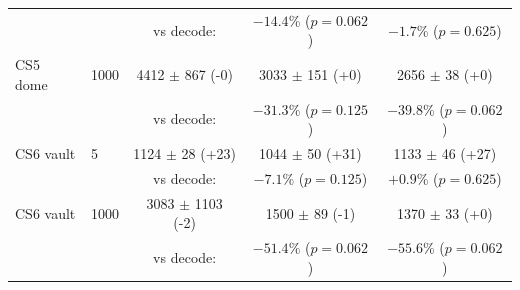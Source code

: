\begin{table}[!htbp]
\begin{tabular}{llccc}
 & & vs decode: & $-14.4$\% ($p=0.062$) & $-1.7$\% ($p=0.625$) \\[2pt]
CS5 dome & 1000 & 4412 $\pm$ 867 (-0) & 3033 $\pm$ 151 (+0) & 2656 $\pm$ 38 (+0) \\
 & & vs decode: & $-31.3$\% ($p=0.125$) & $-39.8$\% ($p=0.062$) \\[2pt]
CS6 vault & 5 & 1124 $\pm$ 28 (+23) & 1044 $\pm$ 50 (+31) & 1133 $\pm$ 46 (+27) \\
 & & vs decode: & $-7.1$\% ($p=0.125$) & $+0.9$\% ($p=0.625$) \\[2pt]
CS6 vault & 1000 & 3083 $\pm$ 1103 (-2) & 1500 $\pm$ 89 (-1) & 1370 $\pm$ 33 (+0) \\
 & & vs decode: & $-51.4$\% ($p=0.062$) & $-55.6$\% ($p=0.062$) \\[2pt]
\bottomrule
\end{tabular}
\normalsize
\end{table}
